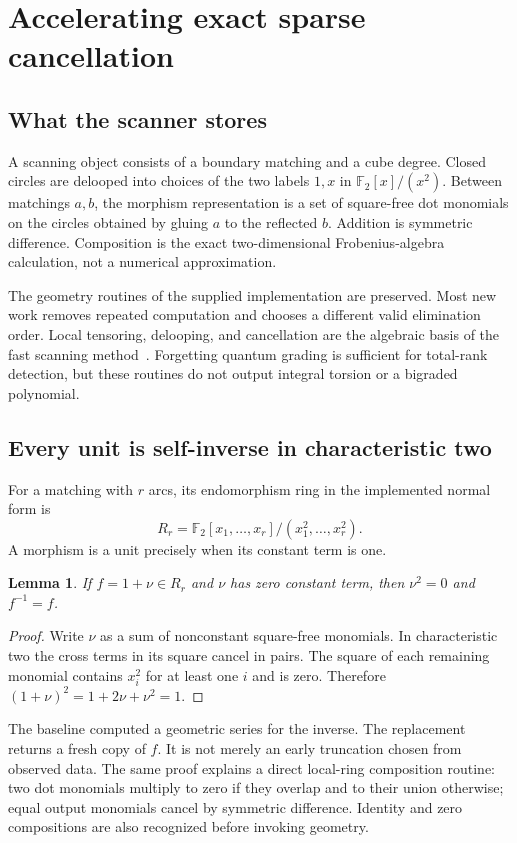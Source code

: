 \documentclass[11pt]{article}
\newtheorem{lemma}[theorem]{Lemma}
\theoremstyle{definition}\newtheorem{definition}[theorem]{Definition}
\theoremstyle{remark}\newtheorem{remark}[theorem]{Remark}
\newcommand{\F}{\mathbb F_2}
\begin{document}
\section{Accelerating exact sparse cancellation}\label{sec:cancellation}
\subsection{What the scanner stores}
A scanning object consists of a boundary matching and a cube degree. Closed
circles are delooped into choices of the two labels $1,x$ in
$\F[x]/(x^2)$. Between matchings $a,b$, the morphism representation is a set of
square-free dot monomials on the circles obtained by gluing $a$ to the reflected
$b$. Addition is symmetric difference. Composition is the exact two-dimensional
Frobenius-algebra calculation, not a numerical approximation.

The geometry routines of the supplied implementation are preserved. Most new
work removes repeated computation and chooses a different valid elimination
order. Local tensoring, delooping, and cancellation are the algebraic basis of
the fast scanning method~\cite{BN}. Forgetting quantum grading is sufficient for
total-rank detection, but these routines do not output integral torsion or a
bigraded polynomial.

\subsection{Every unit is self-inverse in characteristic two}
For a matching with $r$ arcs, its endomorphism ring in the implemented normal
form is
\[
 R_r=\F[x_1,\ldots,x_r]/(x_1^2,\ldots,x_r^2).
\]
A morphism is a unit precisely when its constant term is one.

\begin{lemma}\label{lem:inverse}
If $f=1+\nu\in R_r$ and $\nu$ has zero constant term, then $\nu^2=0$ and
$f^{-1}=f$.
\end{lemma}
\begin{proof}
Write $\nu$ as a sum of nonconstant square-free monomials. In characteristic
two the cross terms in its square cancel in pairs. The square of each remaining
monomial contains $x_i^2$ for at least one $i$ and is zero. Therefore
$(1+\nu)^2=1+2\nu+\nu^2=1$.
\end{proof}
The baseline computed a geometric series for the inverse. The replacement
returns a fresh copy of $f$. It is not merely an early truncation chosen from
observed data. The same proof explains a direct local-ring composition routine:
two dot monomials multiply to zero if they overlap and to their union otherwise;
equal output monomials cancel by symmetric difference. Identity and zero
compositions are also recognized before invoking geometry.
\end{document}
